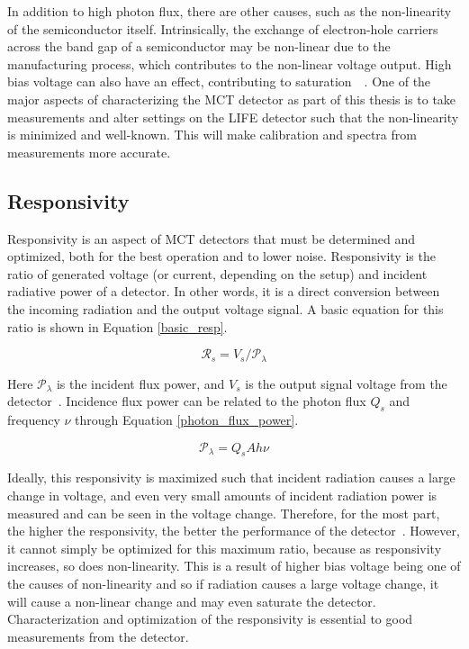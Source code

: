 In addition to high photon flux, there are other causes, such as the non-linearity of the semiconductor itself. Intrinsically, the exchange of electron-hole carriers across the band gap of a semiconductor may be non-linear due to the manufacturing process, which contributes to the non-linear voltage output. High bias voltage can also have an effect, contributing to saturation~\citep{current_measurement_MCTs}~\citep{MCT_linearity}. One of the major aspects of characterizing the MCT detector as part of this thesis is to take measurements and alter settings on the LIFE detector such that the non-linearity is minimized and well-known. This will make calibration and spectra from measurements more accurate.

\subsection {Responsivity}
Responsivity is an aspect of MCT detectors that must be determined and optimized, both for the best operation and to lower noise. Responsivity is the ratio of generated voltage (or current, depending on the setup) and incident radiative power of a detector. In other words, it is a direct conversion between the incoming radiation and the output voltage signal. A basic equation for this ratio is shown in Equation \ref{basic_resp}.

\begin{equation}\label{basic_resp}
    \mathcal{R}_s = V_s / \mathcal{P}_{\lambda}
\end{equation}

Here $\mathcal{P}_{\lambda}$ is the incident flux power, and $V_s$ is the output signal voltage from the detector~\citep{mct_detector_text_old}. Incidence flux power can be related to the photon flux $Q_s$ and frequency $\nu$ through Equation \ref{photon_flux_power}.

\begin{equation}\label{photon_flux_power}
    \mathcal{P}_\lambda = Q_s A h \nu
\end{equation}

Ideally, this responsivity is maximized such that incident radiation causes a large change in voltage, and even very small amounts of incident radiation power is measured and can be seen in the voltage change. Therefore, for the most part, the higher the responsivity, the better the performance of the detector~\citep{GLORIA_PhD}. However, it cannot simply be optimized for this maximum ratio, because as responsivity increases, so does non-linearity. This is a result of higher bias voltage being one of the causes of non-linearity and so if radiation causes a large voltage change, it will cause a non-linear change and may even saturate the detector. Characterization and optimization of the responsivity is essential to good measurements from the detector.

